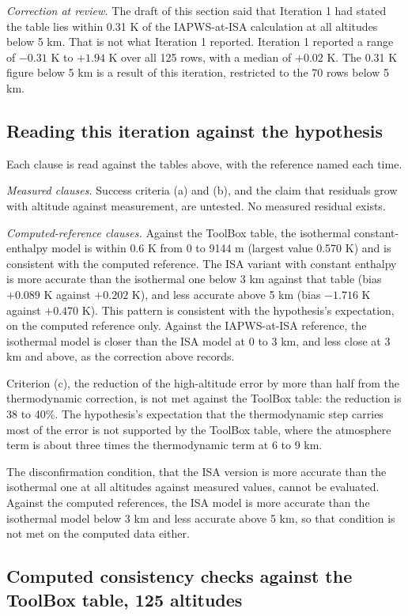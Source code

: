 \documentclass[11pt,letterpaper]{article}
\begin{document}
\emph{Correction at review.} The draft of this section said that Iteration 1 had stated the table lies within 0.31 K of the IAPWS-at-ISA calculation at all altitudes below 5 km. That is not what Iteration 1 reported. Iteration 1 reported a range of $-0.31$ K to $+1.94$ K over all 125 rows, with a median of $+0.02$ K. The 0.31 K figure below 5 km is a result of this iteration, restricted to the 70 rows below 5 km.

\subsection{Reading this iteration against the hypothesis}

Each clause is read against the tables above, with the reference named each time.

\emph{Measured clauses.} Success criteria (a) and (b), and the claim that residuals grow with altitude against measurement, are untested. No measured residual exists.

\emph{Computed-reference clauses.} Against the ToolBox table, the isothermal constant-enthalpy model is within 0.6 K from 0 to 9144 m (largest value 0.570 K) and is consistent with the computed reference. The ISA variant with constant enthalpy is more accurate than the isothermal one below 3 km against that table (bias $+0.089$ K against $+0.202$ K), and less accurate above 5 km (bias $-1.716$ K against $+0.470$ K). This pattern is consistent with the hypothesis's expectation, on the computed reference only. Against the IAPWS-at-ISA reference, the isothermal model is closer than the ISA model at 0 to 3 km, and less close at 3 km and above, as the correction above records.

Criterion (c), the reduction of the high-altitude error by more than half from the thermodynamic correction, is not met against the ToolBox table: the reduction is 38 to 40\%. The hypothesis's expectation that the thermodynamic step carries most of the error is not supported by the ToolBox table, where the atmosphere term is about three times the thermodynamic term at 6 to 9 km.

The disconfirmation condition, that the ISA version is more accurate than the isothermal one at all altitudes against measured values, cannot be evaluated. Against the computed references, the ISA model is more accurate than the isothermal model below 3 km and less accurate above 5 km, so that condition is not met on the computed data either.

\subsection{Computed consistency checks against the ToolBox table, 125 altitudes}
\end{document}

